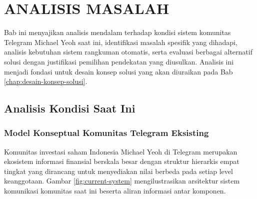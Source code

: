 \chapter{ANALISIS MASALAH}
\label{chap:analisis-masalah}

Bab ini menyajikan analisis mendalam terhadap kondisi sistem komunitas Telegram Michael Yeoh saat ini, identifikasi masalah spesifik yang dihadapi, analisis kebutuhan sistem rangkuman otomatis, serta evaluasi berbagai alternatif solusi dengan justifikasi pemilihan pendekatan yang diusulkan. Analisis ini menjadi fondasi untuk desain konsep solusi yang akan diuraikan pada Bab \ref{chap:desain-konsep-solusi}.

\section{Analisis Kondisi Saat Ini}
\label{sec:kondisi-saat-ini}

\subsection{Model Konseptual Komunitas Telegram Eksisting}

Komunitas investasi saham Indonesia Michael Yeoh di Telegram merupakan ekosistem informasi finansial berskala besar dengan struktur hierarkis empat tingkat yang dirancang untuk menyediakan nilai berbeda pada setiap level keanggotaan. Gambar \ref{fig:current-system} mengilustrasikan arsitektur sistem komunikasi komunitas saat ini beserta aliran informasi antar komponen.

